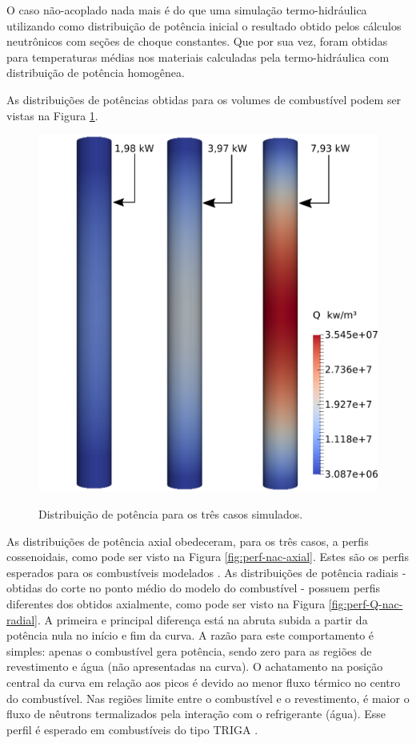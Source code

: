 O caso não-acoplado nada mais é do que uma simulação termo-hidráulica utilizando como distribuição de potência
inicial o resultado obtido pelos cálculos neutrônicos com seções de choque constantes. Que por sua vez, foram
obtidas para temperaturas médias nos materiais calculadas pela termo-hidráulica com distribuição de potência
homogênea.

As distribuições de potências obtidas para os volumes de combustível podem ser vistas na Figura \ref{fig:pot-nc}.

\begin{figure}[htb]
  \caption[Distribuição de potência para os três casos simulados.]{Distribuição de potência para os três casos simulados.}
  \centering\includegraphics[scale=0.5]{figuras/Q_fuel_all_NC.png}
  \label{fig:pot-nc}
\end{figure}

As distribuições de potência axial obedeceram, para os três casos, a perfis
cossenoidais, como pode ser visto na Figura \ref{fig:perf-nac-axial}. Estes são os perfis esperados para
os combustíveis modelados \cite{Veloso2005}. As distribuições de potência radiais -
obtidas do corte no ponto médio do modelo do combustível - possuem perfis diferentes
dos obtidos axialmente, como pode ser visto na Figura \ref{fig:perf-Q-nac-radial}.
A primeira e principal diferença está na abruta subida a partir da potência nula
no início e fim da curva. A razão para este comportamento é simples: apenas o combustível gera potência, sendo
zero para as regiões de revestimento e água (não apresentadas na curva). O achatamento na posição central
da curva em relação aos picos é devido ao menor fluxo térmico no centro do combustível. Nas regiões limite
entre o combustível e o revestimento, é maior o fluxo de nêutrons termalizados pela interação com o refrigerante (água).
Esse perfil é esperado em combustíveis do tipo TRIGA \cite{Ravnik1990}.


